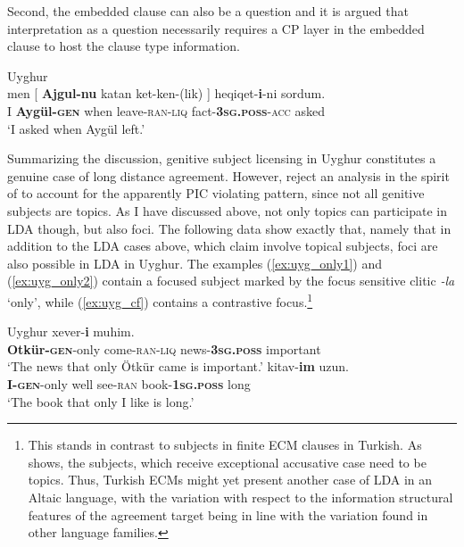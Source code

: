 \documentclass[output=paper
,modfonts
,nonflat]{langsci/langscibook}
\begin{document}
Second, the embedded clause can also be a question and it is argued that interpretation as a question necessarily requires a CP layer in the embedded clause to host the clause type information.
\begin{exe}
\ex Uyghur \citep[][8]{Asarina_Hartman2011a}\\
	\gll men [ \textbf{Ajgul-nu} katan ket-ken-(lik) ] heqiqet-\textbf{i}-ni sordum.\\
		 I {} \textbf{Aygül-\textsc{gen}} when leave-\textsc{ran}-\textsc{liq} {} fact-\textbf{\textsc{3sg.poss}}-\textsc{acc} asked\\
	\glt `I asked when Aygül left.'
\end{exe}
Summarizing the discussion, genitive subject licensing in Uyghur constitutes a genuine case of long distance agreement. However, \citet{Asarina_Hartman2011a} reject an analysis in the spirit of \citet{Polinsky_Potsdam2001} to account for the apparently PIC violating pattern, since not all genitive subjects are topics. As I have discussed above, not only topics can participate in LDA though, but also foci. The following data show exactly that, namely that in addition to the LDA cases above, which \citet{Asarina_Hartman2011a} claim involve topical subjects, foci are also possible in LDA in Uyghur. The examples (\ref{ex:uyg_only1}) and (\ref{ex:uyg_only2}) contain a focused subject marked by the focus sensitive clitic \textit{-la} `only', while (\ref{ex:uyg_cf}) contains a contrastive focus.\footnote{This stands in contrast to subjects in finite ECM clauses in Turkish. As \citet{Sener2008} shows, the subjects, which receive exceptional accusative case need to be topics. Thus, Turkish ECMs might yet present another case of LDA in an Altaic language, with the variation with respect to the information structural features of the agreement target being in line with the variation found in other language families.}
\begin{exe}
\ex Uyghur \citep[][10]{Asarina_Hartman2011a}
	\xlist
	\ex \label{ex:uyg_only1}
		 xever-\textbf{i} muhim.\\
			 {} \textbf{Otkür-\textsc{gen}}-only come-\textsc{ran}-\textsc{liq} {} news-\textbf{3\textsc{sg.poss}} important\\
		\glt `The news that only Ötkür came is important.'
	\ex \label{ex:uyg_only2}
		 kitav-\textbf{im} uzun.\\
			 {} \textbf{I-\textsc{gen}}-only well see-\textsc{ran} {} book-\textbf{1\textsc{sg.poss}} long\\
		\glt `The book that only I like is long.'
	\endxlist
\end{exe}
\end{document}
